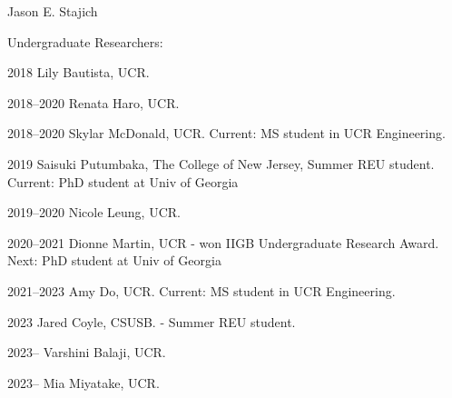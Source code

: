 \documentclass[10pt]{article}
\begin{document}
\begin{cv}{\centerline{Jason E. Stajich}}
\begin{cvlistcompact}{Undergraduate Researchers:}
\item [2018] Lily Bautista, UCR.
\item [2018--2020] Renata Haro, UCR.
\item [2018--2020] Skylar McDonald, UCR. Current: MS student in UCR Engineering.
\item [2019] Saisuki Putumbaka, The College of New Jersey, Summer REU student. Current: PhD student at Univ of Georgia
\item [2019--2020] Nicole Leung, UCR.
\item [2020--2021] Dionne Martin, UCR - won IIGB Undergraduate Research Award. Next: PhD student at Univ of Georgia
\item [2021--2023] Amy Do, UCR. Current: MS student in UCR Engineering.
\item [2023] Jared Coyle, CSUSB. - Summer REU student.
\item [2023--] Varshini Balaji, UCR.
\item [2023--] Mia Miyatake, UCR.


\end{cvlistcompact}


\end{cv}
\end{document}
